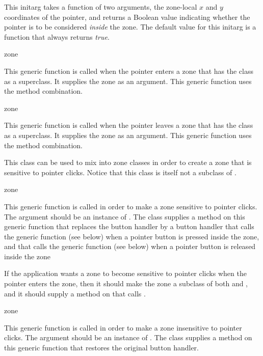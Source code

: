 
This initarg takes a function of two arguments, the zone-local $x$ and
$y$ coordinates of the pointer, and returns a Boolean value indicating
whether the pointer is to be considered \emph{inside} the zone.  The
default value for this initarg is a function that always returns
\emph{true}. 

 {zone}

This generic function is called when the pointer enters a zone that
has the class  as a superclass.  It supplies the zone as
an argument.  This generic function uses the  method
combination.

 {zone}

This generic function is called when the pointer leaves a zone that
has the class  as a superclass.  It supplies the zone as
an argument.  This generic function uses the  method
combination.


This class can be used to mix into zone classes in order to create a
zone that is sensitive to pointer clicks.  Notice that this class is
itself not a subclass of . 

 {zone}

This generic function is called in order to make a zone sensitive to
pointer clicks.  The argument should be an instance of
.  The class  supplies a method on
this generic function that replaces the button handler by a button
handler that calls the generic function  (see
below) when a pointer button is pressed inside the zone, and that
calls the generic function  (see below) when a
pointer button is released inside the zone

If the application wants a zone to become sensitive to pointer clicks
when the pointer enters the zone, then it should make the zone a
subclass of both  and , and it should
supply a method on  that calls . 

 {zone}

This generic function is called in order to make a zone insensitive to
pointer clicks.  The argument should be an instance of
.  The class  supplies a method on
this generic function that restores the original button handler.

